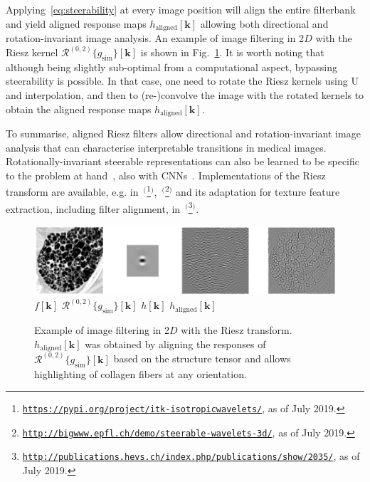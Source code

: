 \documentclass[fleqn,a4paper,oneside,openany]{book}
\begin{document}
Applying~\eqref{eq:steerability} at every image position will align the entire filterbank and yield aligned response maps $h_{\text{aligned}}[\boldsymbol{k}]$ allowing both directional and rotation-invariant image analysis.
An example of image filtering in 2$D$ with the Riesz kernel $\mathcal{R}^{(0,2)}
\{g_{\text{sim}}\}[\boldsymbol{k}]$ is shown in Fig.~\ref{fig:RieszExample}.
It is worth noting that although being slightly sub-optimal from a computational aspect, bypassing steerability is possible. In that case, one need to rotate the Riesz kernels using $\mathrm{U}$ and interpolation, and then to (re-)convolve the image with the rotated kernels to obtain the aligned response maps $h_{\text{aligned}}[\boldsymbol{k}]$.

To summarise, aligned Riesz filters allow directional and rotation-invariant image analysis that can characterise interpretable transitions in medical images.
Rotationally-invariant steerable representations can also be learned to be specific to the problem at hand~\cite{Depeursinge2017,AFO2019}, also with CNNs~\cite{AFO2019,AFO2019b,WHS2018,Winkels2019,Weiler2018,bekkers2018roto}.
%
Implementations of the Riesz transform are available, e.g. in~\cite{Her2016}$^($\footnote{\texttt{\url{https://pypi.org/project/itk-isotropicwavelets/}}, as of July 2019.}$^)$,~\cite{ChU2012}$^($\footnote{\texttt{\url{http://bigwww.epfl.ch/demo/steerable-wavelets-3d/}}, as of July 2019.}$^)$ and its adaptation for texture feature extraction, including filter alignment, in~\cite{DMP2017}$^($\footnote{\texttt{\url{http://publications.hevs.ch/index.php/publications/show/2035/}}, as of July 2019.}$^)$.

%
\begin{figure}
\centering
\includegraphics[trim = 0 0 0 0, clip, width=\linewidth]{Riesz_example.png}\\
$f[\boldsymbol{k}]$
\hspace{2cm}
$\mathcal{R}^{(0,2)}
\{g_{\text{sim}}\}[\boldsymbol{k}]$
\hspace{1.8cm}
$h[\boldsymbol{k}]$
\hspace{2.8cm}
$h_{\text{aligned}}[\boldsymbol{k}]$
\caption{Example of image filtering in 2$D$ with the Riesz transform.
$h_{\text{aligned}}[\boldsymbol{k}]$ was obtained by aligning the responses of $\mathcal{R}^{(0,2)}
\{g_{\text{sim}}\}[\boldsymbol{k}]$ based on the structure tensor and allows highlighting of collagen fibers at any orientation.}
  \label{fig:RieszExample}
\end{figure}
%
\end{document}
